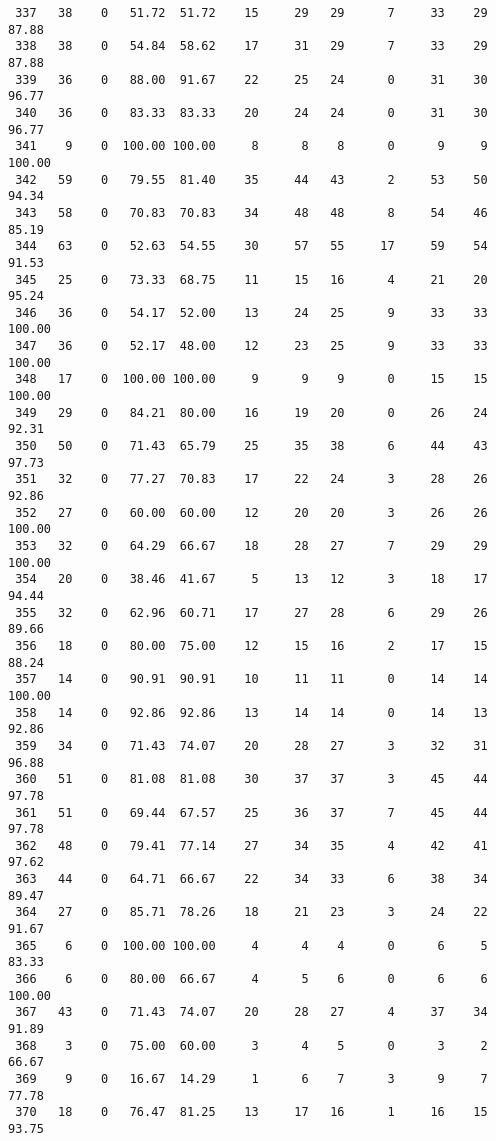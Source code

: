 \begin{verbatim}
 337   38    0   51.72  51.72    15     29   29      7     33    29    87.88
 338   38    0   54.84  58.62    17     31   29      7     33    29    87.88
 339   36    0   88.00  91.67    22     25   24      0     31    30    96.77
 340   36    0   83.33  83.33    20     24   24      0     31    30    96.77
 341    9    0  100.00 100.00     8      8    8      0      9     9   100.00
 342   59    0   79.55  81.40    35     44   43      2     53    50    94.34
 343   58    0   70.83  70.83    34     48   48      8     54    46    85.19
 344   63    0   52.63  54.55    30     57   55     17     59    54    91.53
 345   25    0   73.33  68.75    11     15   16      4     21    20    95.24
 346   36    0   54.17  52.00    13     24   25      9     33    33   100.00
 347   36    0   52.17  48.00    12     23   25      9     33    33   100.00
 348   17    0  100.00 100.00     9      9    9      0     15    15   100.00
 349   29    0   84.21  80.00    16     19   20      0     26    24    92.31
 350   50    0   71.43  65.79    25     35   38      6     44    43    97.73
 351   32    0   77.27  70.83    17     22   24      3     28    26    92.86
 352   27    0   60.00  60.00    12     20   20      3     26    26   100.00
 353   32    0   64.29  66.67    18     28   27      7     29    29   100.00
 354   20    0   38.46  41.67     5     13   12      3     18    17    94.44
 355   32    0   62.96  60.71    17     27   28      6     29    26    89.66
 356   18    0   80.00  75.00    12     15   16      2     17    15    88.24
 357   14    0   90.91  90.91    10     11   11      0     14    14   100.00
 358   14    0   92.86  92.86    13     14   14      0     14    13    92.86
 359   34    0   71.43  74.07    20     28   27      3     32    31    96.88
 360   51    0   81.08  81.08    30     37   37      3     45    44    97.78
 361   51    0   69.44  67.57    25     36   37      7     45    44    97.78
 362   48    0   79.41  77.14    27     34   35      4     42    41    97.62
 363   44    0   64.71  66.67    22     34   33      6     38    34    89.47
 364   27    0   85.71  78.26    18     21   23      3     24    22    91.67
 365    6    0  100.00 100.00     4      4    4      0      6     5    83.33
 366    6    0   80.00  66.67     4      5    6      0      6     6   100.00
 367   43    0   71.43  74.07    20     28   27      4     37    34    91.89
 368    3    0   75.00  60.00     3      4    5      0      3     2    66.67
 369    9    0   16.67  14.29     1      6    7      3      9     7    77.78
 370   18    0   76.47  81.25    13     17   16      1     16    15    93.75

\end{verbatim}
